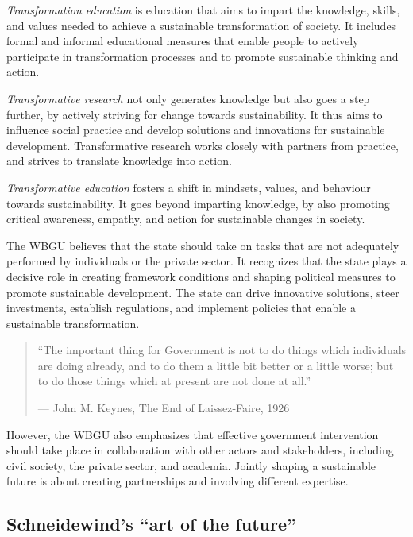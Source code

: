 \documentclass[
  a4paper,
  openany]{book}
\begin{document}
\emph{Transformation education} is education that aims to impart the
knowledge, skills, and values needed to achieve a sustainable
transformation of society. It includes formal and informal educational
measures that enable people to actively participate in transformation
processes and to promote sustainable thinking and action.

\emph{Transformative research} not only generates knowledge but also
goes a step further, by actively striving for change towards
sustainability. It thus aims to influence social practice and develop
solutions and innovations for sustainable development. Transformative
research works closely with partners from practice, and strives to
translate knowledge into action.

\emph{Transformative education} fosters a shift in mindsets, values, and
behaviour towards sustainability. It goes beyond imparting knowledge, by
also promoting critical awareness, empathy, and action for sustainable
changes in society.

The WBGU believes that the state should take on tasks that are not
adequately performed by individuals or the private sector. It recognizes
that the state plays a decisive role in creating framework conditions
and shaping political measures to promote sustainable development. The
state can drive innovative solutions, steer investments, establish
regulations, and implement policies that enable a sustainable
transformation.

\begin{quote}
``The important thing for Government is not to do things which
individuals are doing already, and to do them a little bit better or a
little worse; but to do those things which at present are not done at
all.''

--- John M. Keynes, The End of Laissez-Faire, 1926
\end{quote}

However, the WBGU also emphasizes that effective government intervention
should take place in collaboration with other actors and stakeholders,
including civil society, the private sector, and academia. Jointly
shaping a sustainable future is about creating partnerships and
involving different expertise.

\subsection{Schneidewind's ``art of the
future''}\label{schneidewinds-art-of-the-future}
\end{document}
